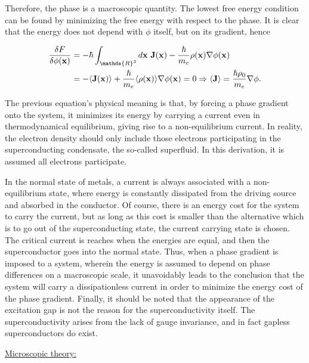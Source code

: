 \documentclass{homework}
\begin{document}
Therefore, the phase is a macroscopic quantity. The lowest free energy condition can be found by minimizing the free energy with respect to the phase. It is clear that the energy does not depend with $\phi$ itself, but on its gradient, hence

\begin{equation}
\begin{split}
    \frac{\delta F}{\delta \phi({\bf x})} &= - \hbar \int_{\mathds{R}^3} d{\bf x} \blanky {\bf J}({\bf x}) - \frac{\hbar}{m_e} \rho({\bf x}) \nabla \phi({\bf x}) \\
    &= - \langle {\bf J}({\bf x}) \rangle + \frac{\hbar}{m_e} \langle \rho({\bf x}) \rangle \nabla \phi({\bf x}) = 0   \Rightarrow \langle {\bf J} \rangle = \frac{\hbar \rho_0}{m_e} \nabla \phi.
\end{split}
\end{equation}

The previous equation's physical meaning is that, by forcing a phase gradient onto the system, it minimizes its energy by carrying a current even in thermodynamical equilibrium, giving rise to a non-equilibrium current. In reality, the electron density should only include those electrons participating in the superconducting condensate, the so-called superfluid. In this derivation, it is assumed all electrons participate. 

In the normal state of metals, a current is always associated with a non-equilibrium state, where energy is constantly dissipated from the driving source and absorbed in the conductor. Of course, there is an energy cost for the system to carry the current, but as long as this cost is smaller than the alternative which is to go out of the superconducting state, the current carrying state is chosen. The critical current is reaches when the energies are equal, and then the superconductor goes into the normal state. Thus, when a phase gradient is imposed to a system, wherein the energy is assumed to depend on phase differences on a macroscopic scale, it unavoidably leads to the conclusion that the system will carry a dissipationless current in order to minimize the energy cost of the phase gradient. Finally, it should be noted that the appearance of the excitation gap is not the reason for the superconductivity itself. The superconductivity arises from the lack of gauge invariance, and in fact gapless superconductors do exist. \\

\clearpage

\underline{Microscopic theory:} 
\end{document}
